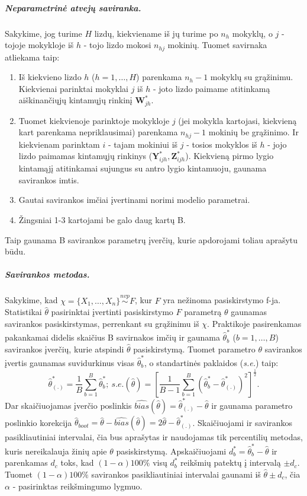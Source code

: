 \documentclass[12pt,a4paper]{article}
\begin{document}
\subparagraph{Neparametrinė atvejų saviranka.} Sakykime, jog turime $H$ lizdų, kiekviename iš jų turime po $n_h$ mokyklų, o $j$ - tojoje mokykloje iš $h$ - tojo lizdo mokosi $n_{hj}$ mokinių. Tuomet savirnaka atliekama taip:
\begin{enumerate}
\item Iš kiekvieno lizdo $h$ ($h=1,\dots,H$) parenkama $n_h-1$ mokyklų su grąžinimu. Kiekvienai parinktai mokyklai $j$ iš $h$ - joto lizdo paimame atitinkamą aiškinančiųjų kintamųjų rinkinį $\mathbf{W}^*_{jh}$.
\item Tuomet kiekvienoje parinktoje mokykloje $j$ (jei mokykla kartojasi, kiekvieną kart parenkama nepriklausimai) parenkama $n_{hj}-1$ mokinių be grąžinimo. Ir kiekvienam parinktam $i$ - tajam mokiniui iš $j$ - tosios mokyklos iš $h$ - jojo lizdo paimamas kintamųjų rinkinys ($\mathbf{Y}^*_{ijh}, \mathbf{Z}^*_{ijh}$). Kiekvieną pirmo lygio kintamąjį atitinkamai sujungus su antro lygio kintamuoju, gaunama savirankos imtis.
\item Gautai savirankos imčiai įvertinami norimi modelio parametrai.
\item Žingsniai 1-3 kartojami be galo daug kartų B.
\end{enumerate}
Taip gaunama B savirankos parametrų įverčių, kurie apdorojami toliau aprašytu būdu.

\subparagraph{Savirankos metodas.} Sakykime, kad $\chi = \{X_1,\dots,X_n\}\stackrel{nvp}{\sim}F$, kur $F$ yra nežinoma pasiskirstymo f-ja. Statistikai $\hat{\theta}$ pasirinktai įvertinti pasiskirstymo $F$ parametrą $\theta$ gaunamas savirankos pasiskirstymas, perrenkant su grąžinimu iš $\chi$. Praktikoje pasirenkamas pakankamai didelis skaičius B savirnakos imčių ir gaunama $\hat{\theta}^*_b$ ($b=1,\dots,B$) savirankos įverčių, kurie atspindi $\hat{\theta}$ pasiskirstymą. Tuomet parametro $\theta$ savirankos įvertis gaunamas suvidurkinus visas $\hat{\theta}^*_b$, o standartinės paklaidos (\textit{s.e.}) taip:
\[
\hat{\theta}^*_{(.)}=\frac{1}{B}\sum^B_{b=1}\hat{\theta}^*_b; \
s.e.(\hat{\theta})=\left[\frac{1}{B-1}\sum^B_{b=1}(\hat{\theta}^*_b - \hat{\theta}^*_{(.)})^2\right]^{\frac{1}{2}}.
\]
Dar skaičiuojamas įverčio poslinkis $\widehat{bias}(\hat{\theta})=\hat{\theta}^*_{(.)}-\hat{\theta}$ ir gaunama parametro poslinkio korekcija $\hat{\theta}_{boot}=\hat{\theta}-\widehat{bias}(\hat{\theta})=2\hat{\theta}-\hat{\theta}^*_{(.)}$. Skaičiuojami ir savirankos pasikliautiniai intervalai, čia bus aprašytas ir naudojamas tik percentilių metodas, kuris nereikalauja žinių apie $\theta$ pasiskirstymą. Apskaičiuojami $d^*_b=\hat{\theta}^*_b-\hat{\theta}$ ir parenkamas $d_c$ toks, kad $(1-\alpha)100\%$ visų $d^*_b$ reikšmių patektų į intervalą $\pm d_c$. Tuomet $(1-\alpha)100\%$ savirankos pasikliautiniai intervalai gaunami iš $\hat{\theta}\pm d_c$, čia $\alpha$ - pasirinktas reikšmingumo lygmuo.
\end{document}
